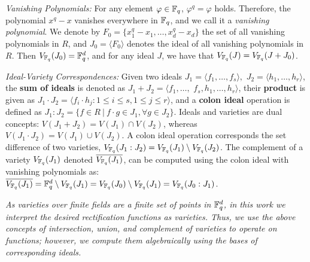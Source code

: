 
{\it Vanishing Polynomials:} For any element $\varphi\in{\mathbb{F}}_{q}$, $\varphi^q=\varphi$ holds. Therefore,
the polynomial $x^q-x$ vanishes everywhere in ${\mathbb{F}}_{q}$, and we call it a
{\it vanishing polynomial}. We denote by $F_0 =
\{x_1^q-x_1,\dots,x_d^q-x_d\}$ the set of all vanishing polynomials in
$R$, and  $J_0 = \langle F_0 \rangle$ denotes the ideal of all
vanishing polynomials in $R$. Then $V_{{\mathbb{F}}_{q}}(J_0) = {\mathbb{F}}_{q}^d$, and for any
ideal $J$, we have that $V_{{\mathbb{F}}_{q}}(J)=V_{{\mathbb{F}}_{q}}(J+J_0)$.

{\it Ideal-Variety Correspondences:} Given two ideals $J_1 = \langle
f_1,\dots,f_s\rangle,$ $J_2=\langle h_1,\dots,h_r\rangle$, the {\bf
  sum of ideals} is denoted as $J_1 + J_2 = \langle
f_1,\dots,$ $f_s,h_1,\dots,h_r\rangle$, their {\bf product} is
given as $J_1\cdot J_2 = \langle f_i\cdot h_j: 1\leq i\leq s, 1\leq
j\leq r\rangle$, and a {\bf colon ideal} operation is defined as
$J_1:J_2 = \{f \in R\ |\ f\cdot g \in J_1, \forall g \in J_2\}$. 
Ideals and varieties are dual concepts:
$V(J_1 + J_2) = V(J_1) \cap V(J_2)$, whereas $V(J_1\cdot J_2) = V(J_1)
\cup V(J_2)$. A colon ideal operation corresponds the set difference of 
two varieties, $V_{{\mathbb{F}}_{q}}(J_1:J_2)=V_{{\mathbb{F}}_{q}}(J_1)
\setminus V_{{\mathbb{F}}_{q}}(J_2)$. 
The complement of a variety $V_{{\mathbb{F}}_{q}}(J_1)$ denoted $\overline{V_{{\mathbb{F}}_{q}}(J_1)}$, 
can be computed using the colon ideal with vanishing polynomials 
as: $\overline{V_{{\mathbb{F}}_{q}}(J_1)} = {\mathbb{F}}_{q}^d \setminus
V_{{\mathbb{F}}_{q}}(J_1) = V_{{\mathbb{F}}_{q}}(J_0) \setminus V_{{\mathbb{F}}_{q}}(J_1) = V_{{\mathbb{F}}_{q}}(J_0:J_1)$.

{\it As varieties over finite fields are a finite set of points in ${\mathbb{F}}_{q}^d$,
in this work we interpret the desired rectification functions as
varieties. Thus, we use the above concepts of intersection, union, and
complement of varieties to operate on functions; however, we compute
them algebraically using the \Grobner bases of corresponding ideals.}



